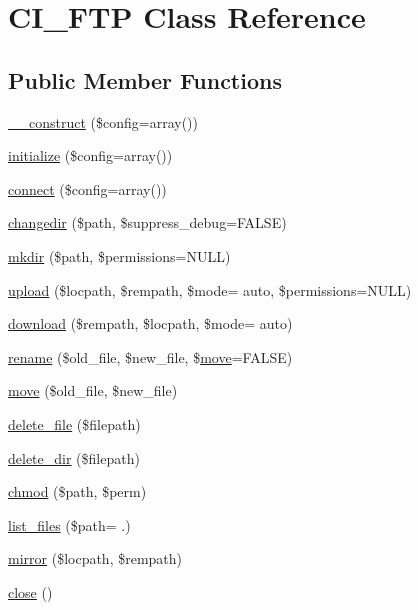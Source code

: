 \hypertarget{class_c_i___f_t_p}{}\section{C\+I\+\_\+\+F\+T\+P Class Reference}
\label{class_c_i___f_t_p}
\subsection*{Public Member Functions}
\begin{DoxyCompactItemize}
\item 
\hyperlink{class_c_i___f_t_p_af7f9493844d2d66e924e3c1df51ce616}{\+\_\+\+\_\+construct} (\$config=array())
\item 
\hyperlink{class_c_i___f_t_p_a481385e36d920f5a5005ace05c6cd016}{initialize} (\$config=array())
\item 
\hyperlink{class_c_i___f_t_p_ab2827759611aaaf0c59e69661122c534}{connect} (\$config=array())
\item 
\hyperlink{class_c_i___f_t_p_a81098bf710d7879da8d69130f136475b}{changedir} (\$path, \$suppress\+\_\+debug=F\+A\+L\+S\+E)
\item 
\hyperlink{class_c_i___f_t_p_a077f5ce3771d83b8196e07ccc27e49ff}{mkdir} (\$path, \$permissions=N\+U\+L\+L)
\item 
\hyperlink{class_c_i___f_t_p_a4f3394c26215f6abd2b92ad311684e1f}{upload} (\$locpath, \$rempath, \$mode= \textquotesingle{}auto\textquotesingle{}, \$permissions=N\+U\+L\+L)
\item 
\hyperlink{class_c_i___f_t_p_af51fa642fa0d4ae454c8c1850d282f65}{download} (\$rempath, \$locpath, \$mode= \textquotesingle{}auto\textquotesingle{})
\item 
\hyperlink{class_c_i___f_t_p_aa670f7340bb15f61d481f4b3c64bd9dc}{rename} (\$old\+\_\+file, \$new\+\_\+file, \$\hyperlink{class_c_i___f_t_p_acb1443339c3058c83b79f0f503630920}{move}=F\+A\+L\+S\+E)
\item 
\hyperlink{class_c_i___f_t_p_acb1443339c3058c83b79f0f503630920}{move} (\$old\+\_\+file, \$new\+\_\+file)
\item 
\hyperlink{class_c_i___f_t_p_aad793fb503643d98b58426421718e18a}{delete\+\_\+file} (\$filepath)
\item 
\hyperlink{class_c_i___f_t_p_af09b3ab08984b145506dcff4f75a051c}{delete\+\_\+dir} (\$filepath)
\item 
\hyperlink{class_c_i___f_t_p_a9af83eefaf53c7362e7108d1f82bf1ab}{chmod} (\$path, \$perm)
\item 
\hyperlink{class_c_i___f_t_p_a4a8692d7ea935946366a916a3013652e}{list\+\_\+files} (\$path= \textquotesingle{}.\textquotesingle{})
\item 
\hyperlink{class_c_i___f_t_p_aea2de30bbdf050cb607bbc5a36772bf3}{mirror} (\$locpath, \$rempath)
\item 
\hyperlink{class_c_i___f_t_p_aa69c8bf1f1dcf4e72552efff1fe3e87e}{close} ()
\end{DoxyCompactItemize}

